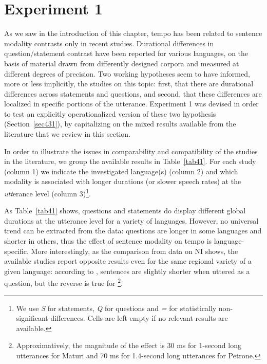 \section{Experiment 1}\label{sec43}
As we saw in the introduction of this chapter, tempo has been related to sentence modality contrasts only in recent studies. Durational differences in question/statement contrast have been reported for various languages, on the basis of material drawn from differently designed corpora and measured at different degrees of precision. Two working hypotheses seem to have informed, more or less implicitly, the studies on this topic: first, that there are durational differences across statements and questions, and second, that these differences are localized in specific portions of the utterance. Experiment 1 was devised in order to test an explicitly operationalized version of these two hypothesis (Section~\ref{sec431}), by capitalizing on the mixed results available from the literature that we review in this section.

In order to illustrate the issues in comparability and compatibility of the studies in the literature, we group the available results in Table~\ref{tab41}. For each study (column 1) we indicate the investigated language(s) (column 2) and which modality is associated with longer durations (or slower speech rates) at the \textit{utt}erance level (column 3)\footnote{We use \textit{S} for statements, \textit{Q} for questions and \textit{=} for statistically non-significant differences. Cells are left empty if no relevant results are available.}. 

As Table~\ref{tab41} shows, questions and statements do display different global durations at the utterance level for a variety of languages. However, no universal trend can be extracted from the data: questions are longer in some languages and shorter in others, thus the effect of sentence modality on tempo is language-specific. More interestingly, as the comparison from data on NI shows, the available studies report opposite results even for the same regional variety of a given language: according to \citet[table 6]{maturi1988intonazione}, sentences are slightly shorter when uttered as a question, but the reverse is true for \citet[p. 163]{petrone2008role}\footnote{Approximatively, the magnitude of the effect is 30 ms for 1-second long utterances for Maturi and 70 ms for 1.4-second long utterances for Petrone.}. 

